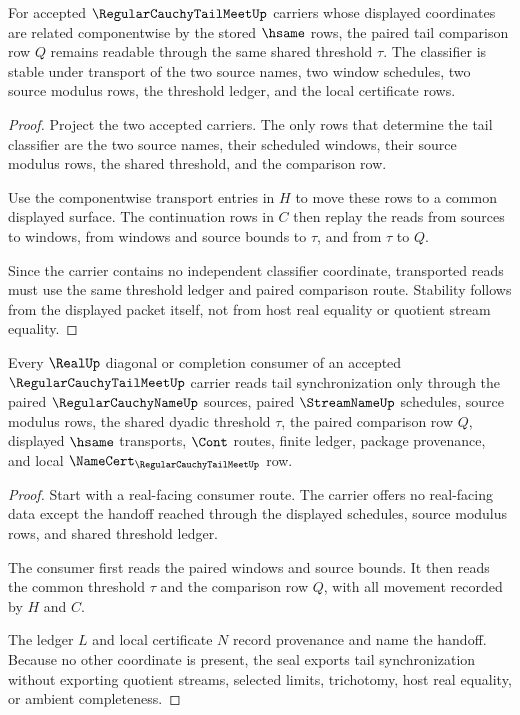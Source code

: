 \begin{theorem}
\label{thm:regular-cauchy-tail-meet-classifier-stability}
For accepted $\RegularCauchyTailMeetUp$ carriers whose displayed coordinates are related componentwise by the stored $\hsame$ rows, the paired tail comparison row $Q$ remains readable through the same shared threshold $\tau$. The classifier is stable under transport of the two source names, two window schedules, two source modulus rows, the threshold ledger, and the local certificate rows.
\end{theorem}
\begin{proof}
Project the two accepted carriers. The only rows that determine the tail classifier are the two source names, their scheduled windows, their source modulus rows, the shared threshold, and the comparison row.

Use the componentwise transport entries in $H$ to move these rows to a common displayed surface. The continuation rows in $C$ then replay the reads from sources to windows, from windows and source bounds to $\tau$, and from $\tau$ to $Q$.

Since the carrier contains no independent classifier coordinate, transported reads must use the same threshold ledger and paired comparison route. Stability follows from the displayed packet itself, not from host real equality or quotient stream equality.
\end{proof}

\begin{theorem}
\label{thm:regular-cauchy-tail-meet-real-seal-handoff}
Every $\RealUp$ diagonal or completion consumer of an accepted $\RegularCauchyTailMeetUp$ carrier reads tail synchronization only through the paired $\RegularCauchyNameUp$ sources, paired $\StreamNameUp$ schedules, source modulus rows, the shared dyadic threshold $\tau$, the paired comparison row $Q$, displayed $\hsame$ transports, $\Cont$ routes, finite ledger, package provenance, and local $\NameCert_{\RegularCauchyTailMeetUp}$ row.
\end{theorem}
\begin{proof}
Start with a real-facing consumer route. The carrier offers no real-facing data except the handoff reached through the displayed schedules, source modulus rows, and shared threshold ledger.

The consumer first reads the paired windows and source bounds. It then reads the common threshold $\tau$ and the comparison row $Q$, with all movement recorded by $H$ and $C$.

The ledger $L$ and local certificate $N$ record provenance and name the handoff. Because no other coordinate is present, the seal exports tail synchronization without exporting quotient streams, selected limits, trichotomy, host real equality, or ambient completeness.
\end{proof}

